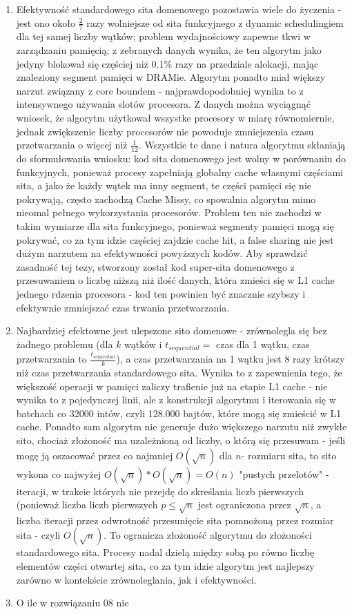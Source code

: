 \documentclass[12pt]{article}
\begin{document}
\begin{enumerate}
	
	\item Efektywność standardowego sita domenowego pozostawia wiele do życzenia - jest ono około \(\frac{2}{7}\) razy wolniejsze od sita funkcyjnego z dynamic schedulingiem dla tej samej liczby wątków; problem wydajnościowy zapewne tkwi w zarządzaniu pamięcią; z zebranych danych wynika, że ten algorytm jako jedyny blokował się częściej niż 0.1\% razy na przedziale alokacji, mając znaleziony segment pamięci w DRAMie. Algorytm ponadto miał większy narzut związany z core boundem - najprawdopodobniej wynika to z intensywnego używania slotów procesora. Z danych można wyciągnąć wniosek, że algorytm użytkował wszystke procesory w miarę równomiernie, jednak zwiększenie liczby procesorów nie powoduje zmniejszenia czasu przetwarzania o więcej niż \(\frac{1}{12}\). Wszystkie te dane i natura algorytmu skłaniają do sformułowania wniosku: kod sita domenowego jest wolny w porównaniu do funkcyjnych, ponieważ procesy zapełniają globalny cache własnymi częściami sita, a jako że każdy wątek ma inny segment, te części pamięci się nie pokrywają, często zachodzą Cache Missy, co spowalnia algorytm mimo nieomal pełnego wykorzystania procesorów. Problem ten nie zachodzi w takim wymiarze dla sita funkcyjnego, ponieważ segmenty pamięci mogą się pokrywać, co za tym idzie częściej zajdzie cache hit, a false sharing nie jest dużym narzutem na efektywności powyższych kodów. Aby sprawdzić zasadność tej tezy, stworzony został kod super-sita domenowego z przesuwaniem o liczbę niższą niż ilość danych, która zmieści się w L1 cache jednego rdzenia procesora - kod ten powinien być znacznie szybszy i efektywnie zmniejszać czas trwania przetwarzania.
	
	
	\item Najbardziej efektowne jest ulepszone sito domenowe - zrównolegla się bez żadnego problemu (dla \(k\) wątków i \(t_{sequential} =\) czas dla 1 wątku, czas przetwarzania to \(\frac{t_{sequential}}{k}\)), a czas przetwarzania na 1 wątku jest 8 razy krótszy niż czas przetwarzania standardowego sita. Wynika to z zapewnienia tego, że większość operacji w pamięci zaliczy trafienie już na etapie L1 cache - nie wynika to z pojedynczej linii, ale z konstrukcji algorytmu i iterowania się w batchach co 32000 intów, czyli 128.000 bajtów, które mogą się zmieścić w L1 cache. Ponadto sam algorytm nie generuje dużo większego narzutu niż zwykłe sito, chociaż złożoność ma uzależnioną od liczby, o którą się przesuwam - jeśli mogę ją oszacować przez co najmniej \(O(\sqrt{n})\) dla \(n\)- rozmiaru sita, to sito wykona co najwyżej \(O(\sqrt{n})*O(\sqrt{n})=O(n)\) "pustych przelotów" - iteracji, w trakcie których nie przejdę do skreślania liczb pierwszych (ponieważ liczba liczb pierwszych \(p\le\sqrt{n}\) jest ograniczona przez \(\sqrt{n}\), a liczba iteracji przez odwrotność przesunięcie sita pomnożoną przez rozmiar sita - czyli \(O(\sqrt{n})\). To ogranicza złożoność algorytmu do złożoności standardowego sita. Procesy nadal dzielą między sobą po równo liczbę elementów części otwartej sita, co za tym idzie algorytm jest najlepszy zarówno w kontekście zrównoleglania, jak i efektywności.
	
	\item {O ile w rozwiązaniu 08 nie }
\end{enumerate}
\end{document}
